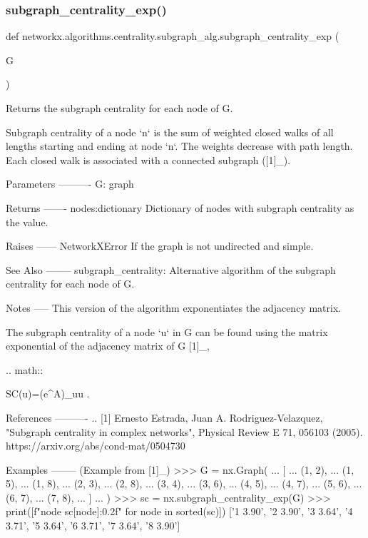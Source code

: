  \mbox{\label{namespacenetworkx_1_1algorithms_1_1centrality_1_1subgraph__alg_af09b3362093a174f361abcce51d556a6}} 
\subsubsection{\texorpdfstring{subgraph\+\_\+centrality\+\_\+exp()}{subgraph\_centrality\_exp()}}
{\footnotesize\ttfamily def networkx.\+algorithms.\+centrality.\+subgraph\+\_\+alg.\+subgraph\+\_\+centrality\+\_\+exp (\begin{DoxyParamCaption}\item[{}]{G }\end{DoxyParamCaption})}

\begin{DoxyVerb}Returns the subgraph centrality for each node of G.

Subgraph centrality  of a node `n` is the sum of weighted closed
walks of all lengths starting and ending at node `n`. The weights
decrease with path length. Each closed walk is associated with a
connected subgraph ([1]_).

Parameters
----------
G: graph

Returns
-------
nodes:dictionary
    Dictionary of nodes with subgraph centrality as the value.

Raises
------
NetworkXError
    If the graph is not undirected and simple.

See Also
--------
subgraph_centrality:
    Alternative algorithm of the subgraph centrality for each node of G.

Notes
-----
This version of the algorithm exponentiates the adjacency matrix.

The subgraph centrality of a node `u` in G can be found using
the matrix exponential of the adjacency matrix of G [1]_,

.. math::

    SC(u)=(e^A)_{uu} .

References
----------
.. [1] Ernesto Estrada, Juan A. Rodriguez-Velazquez,
   "Subgraph centrality in complex networks",
   Physical Review E 71, 056103 (2005).
   https://arxiv.org/abs/cond-mat/0504730

Examples
--------
(Example from [1]_)
>>> G = nx.Graph(
...     [
...         (1, 2),
...         (1, 5),
...         (1, 8),
...         (2, 3),
...         (2, 8),
...         (3, 4),
...         (3, 6),
...         (4, 5),
...         (4, 7),
...         (5, 6),
...         (6, 7),
...         (7, 8),
...     ]
... )
>>> sc = nx.subgraph_centrality_exp(G)
>>> print([f"{node} {sc[node]:0.2f}" for node in sorted(sc)])
['1 3.90', '2 3.90', '3 3.64', '4 3.71', '5 3.64', '6 3.71', '7 3.64', '8 3.90']
\end{DoxyVerb}
 